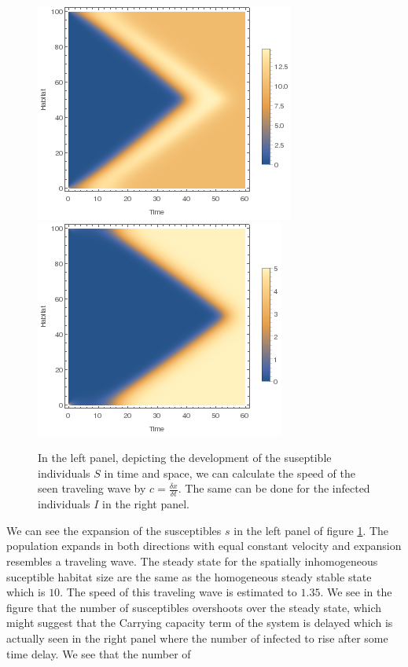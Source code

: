 \begin{figure}
\centering
\includegraphics[scale=0.5]{img/listdensityplot_S.png}
\includegraphics[scale=0.5]{img/listdensityplot_P.png}
\caption{\label{fig:pic1c} In the left panel, depicting the development of the suseptible individuals $S$ in time and space, we can calculate the speed of the seen traveling wave by $c=\frac{\delta x}{\delta t}$. The same can be done for the infected individuals $I$ in the right panel.}
\end{figure}

We can see the expansion of the susceptibles $s$ in the left panel of figure \ref{fig:pic1c}. The population expands in both directions with equal constant velocity and expansion resembles a traveling wave. The steady state for the spatially inhomogeneous suceptible habitat size are the same as the homogeneous steady stable state which is $10$. The speed of this traveling wave is estimated to $1.35$. We see in the figure that the number of susceptibles overshoots over the steady state, which might suggest that the   Carrying capacity term of the system is delayed which is actually seen in the right panel where the number of infected to rise after some time delay. We see that the number of 